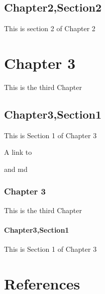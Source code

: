 \documentclass[letterpaper,10pt,english]{sphinxmanual}
\begin{document}
\section{Chapter2,Section2}
\label{\detokenize{chapter2:chapter2-section2}}
This is section 2 of Chapter 2


\chapter{Chapter 3}
\label{\detokenize{chapter3:chapter-3}}\label{\detokenize{chapter3::doc}}
This is the third Chapter


\section{Chapter3,Section1}
\label{\detokenize{chapter3:chapter3-section1}}
This is Section 1 of Chapter 3

A link to {\hyperref[\detokenize{intro:globaltoc}]{}}

and md {\hyperref[\detokenize{intro:globaltoc}]{}}


\subsection{Chapter 3}
\label{\detokenize{chapter3section2:chapter-3}}\label{\detokenize{chapter3section2::doc}}
This is the third Chapter


\subsubsection{Chapter3,Section1}
\label{\detokenize{chapter3section2:chapter3-section1}}
This is Section 1 of Chapter 3


\chapter{References}
\label{\detokenize{references:references}}\label{\detokenize{references::doc}}








\renewcommand{\indexname}{Index}
\printindex
\end{document}
